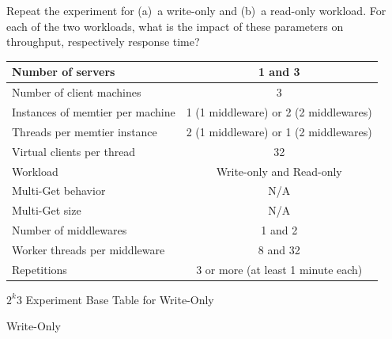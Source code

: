 \documentclass[11pt,a4paper]{article}
\begin{document}
Repeat the experiment for (a)~a write-only and (b)~a read-only workload.
For each of the two workloads, what is the impact of these parameters on throughput, respectively response time?

\begin{center}
	\scriptsize{
		\begin{tabular}{|l|c|}
			\hline Number of servers                & 1 and 3                                     \\ 
			\hline Number of client machines        & 3                                           \\ 
			\hline Instances of memtier per machine & 1 (1 middleware) or 2 (2 middlewares) \\ 
			\hline Threads per memtier instance     & 2 (1 middleware) or 1 (2 middlewares)   \\
			\hline Virtual clients per thread       &  32                                     \\ 
			\hline Workload                         & Write-only and Read-only\\
			\hline Multi-Get behavior               & N/A                                         \\
			\hline Multi-Get size                   & N/A                                         \\
			\hline Number of middlewares            & 1 and 2                                     \\
			\hline Worker threads per middleware    & 8 and 32                                    \\
			\hline Repetitions                      & 3 or more (at least 1 minute each)                                   \\ 
			\hline 
		\end{tabular}
	} 
\end{center}


\begin{table}
	\centering
	\small{
		\caption{$2^k3$ Experiment Base Table for Write-Only}
		\label{exp60_wo_2k_base} 
		\setlength{\tabcolsep}{4.5pt}
		
	}
\end{table}


\begin{table}
	\small{
		\centering
		\caption{Write-Only}
		\label{exp60_wo_2k_effect}
		\setlength{\tabcolsep}{4.7pt}
		\newcommand{\rlft}[0]{\raggedleft\arraybackslash}
		
	}
\end{table}
\end{document}
